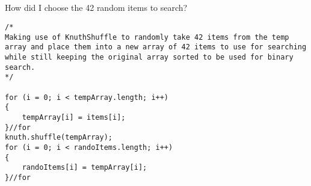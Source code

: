 \documentclass[letterpaper, 10pt]{article}
\begin{document}
\subsection{}
How did I choose the 42 random items to search?
\begin{lstlisting}
/*
Making use of KnuthShuffle to randomly take 42 items from the temp 
array and place them into a new array of 42 items to use for searching
while still keeping the original array sorted to be used for binary search.
*/

for (i = 0; i < tempArray.length; i++)
{
	tempArray[i] = items[i];
}//for
knuth.shuffle(tempArray);
for (i = 0; i < randoItems.length; i++)
{
	randoItems[i] = tempArray[i];
}//for
\end{lstlisting}
\end{document}
